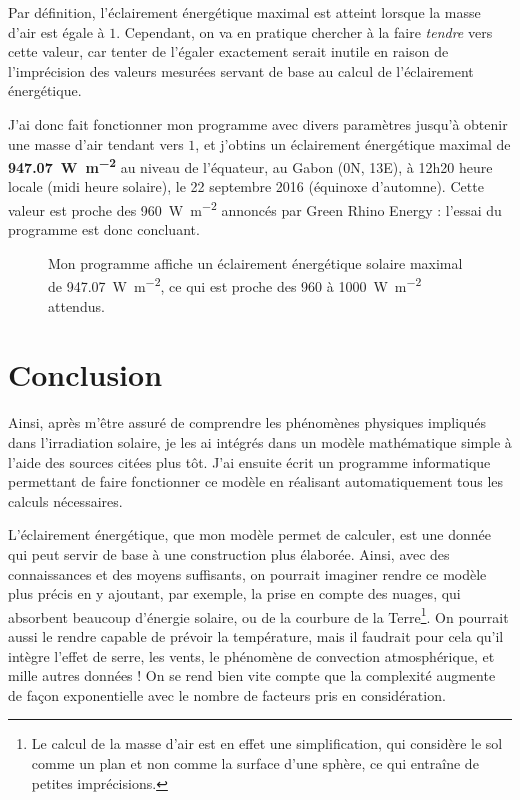 \documentclass[12pt]{article}
\begin{document}
Par définition, l'éclairement énergétique maximal est atteint lorsque la masse d'air est égale à $1$.
Cependant, on va en pratique chercher à la faire \emph{tendre} vers cette valeur, car tenter de l'égaler exactement serait inutile en raison de l'imprécision des valeurs mesurées servant de base au calcul de l'éclairement énergétique.

J'ai donc fait fonctionner mon programme avec divers paramètres jusqu'à obtenir une masse d'air tendant vers $1$, et j'obtins un éclairement énergétique maximal de \textbf{\SI{947.07}{\watt\per\square\meter}} au niveau de l'équateur, au Gabon (0\degree N, 13\degree E), à 12h20 heure locale (midi heure solaire), le 22 septembre 2016 (équinoxe d'automne).
Cette valeur est proche des \SI{960}{\watt\per\square\meter} annoncés par Green Rhino Energy : l'essai du programme est donc concluant.

\begin{figure}[!ht]
  \centering
  \caption{Mon programme affiche un éclairement énergétique solaire maximal de \SI{947.07}{\watt\per\square\meter}, ce qui est proche des 960 à \SI{1000}{\watt\per\square\meter} attendus.}
  \label{fig:maximum}
\end{figure}



\clearpage
\section{Conclusion}

Ainsi, après m'être assuré de comprendre les phénomènes physiques impliqués dans l'irradiation solaire, je les ai intégrés dans un modèle mathématique simple à l'aide des sources citées plus tôt. J'ai ensuite écrit un programme informatique permettant de faire fonctionner ce modèle en réalisant automatiquement tous les calculs nécessaires.

L'éclairement énergétique, que mon modèle permet de calculer, est une donnée qui peut servir de base à une construction plus élaborée.
Ainsi, avec des connaissances et des moyens suffisants, on pourrait imaginer rendre ce modèle plus précis en y ajoutant, par exemple, la prise en compte des nuages, qui absorbent beaucoup d'énergie solaire, ou de la courbure de la Terre\footnote{Le calcul de la masse d'air est en effet une simplification, qui considère le sol comme un plan et non comme la surface d'une sphère, ce qui entraîne de petites imprécisions.}.
On pourrait aussi le rendre capable de prévoir la température, mais il faudrait pour cela qu'il intègre l'effet de serre, les vents, le phénomène de convection atmosphérique, et mille autres données !
On se rend bien vite compte que la complexité augmente de façon exponentielle avec le nombre de facteurs pris en considération.
\end{document}
